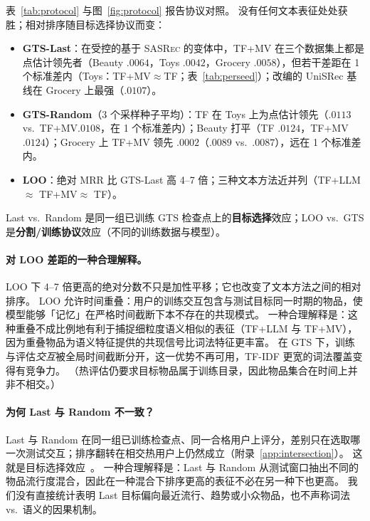 \documentclass[sigconf,natbib=true,anonymous]{acmart}
\newcommand{\tfidf}{\textsc{TF-IDF}\xspace}
\newcommand{\tfllm}{\textsc{TF+LLM}\xspace}
\newcommand{\tfmv}{\textsc{TF+MV}\xspace}
\newcommand{\base}{\textsc{SASRec}\xspace}
\begin{document}
表~\ref{tab:protocol} 与图~\ref{fig:protocol} 报告协议对照。
没有任何文本表征处处获胜；相对排序随目标选择协议而变：

\begin{itemize}[leftmargin=*,itemsep=1pt]
\item \textbf{GTS-Last}：在受控的基于 \base 的变体中，\tfmv 在三个数据集上都是点估计领先者（Beauty $.0064$，Toys $.0042$，Grocery $.0058$），但若干差距在 1 个标准差内（Toys：\tfmv$\approx$TF；表~\ref{tab:perseed}）；改编的 UniSRec 基线在 Grocery 上最强（$.0107$）。
\item \textbf{GTS-Random}（3 个采样种子平均）：TF 在 Toys 上为点估计领先（$.0113$ vs.\ \tfmv $.0108$，在 1 个标准差内）；Beauty 打平（TF $.0124$，\tfmv $.0124$）；Grocery 上 \tfmv 领先 $.0002$（$.0089$ vs.\ $.0087$），远在 1 个标准差内。
\item \textbf{LOO}：绝对 MRR 比 GTS-Last 高 4--7 倍；三种文本方法近并列（\tfllm $\approx$ \tfmv $\approx$ TF）。
\end{itemize}
Last vs.\ Random 是同一组已训练 GTS 检查点上的\textbf{目标选择}效应；LOO vs.\ GTS 是\textbf{分割/训练协议}效应（不同的训练数据与模型）。

\paragraph{对 LOO 差距的一种合理解释。}
LOO 下 4--7 倍更高的绝对分数不只是加性平移；它也改变了文本方法之间的相对排序。
LOO 允许时间重叠：用户的训练交互包含与测试目标同一时期的物品，使模型能够「记忆」在严格时间截断下本不存在的共现模式。
一种合理解释是：这种重叠不成比例地有利于捕捉细粒度语义相似的表征（\tfllm 与 \tfmv），因为重叠物品为语义特征提供的共现信号比词法特征更丰富。
在 GTS 下，训练与评估\emph{交互}被全局时间截断分开，这一优势不再可用，\tfidf 更宽的词法覆盖变得有竞争力。
（热评估仍要求目标物品属于训练目录，因此物品集合在时间上并非不相交。）

\paragraph{为何 Last 与 Random 不一致？}
Last 与 Random 在同一组已训练检查点、同一合格用户上评分，差别只在选取哪一次测试交互；排序翻转在相交热用户上仍然成立（附录~\ref{app:intersection}）。
这就是目标选择效应~\cite{gusak2025time}。
一种合理解释是：Last 与 Random 从测试窗口抽出不同的物品流行度混合，因此在一种混合下排序更高的表征不必在另一种下也更高。
我们没有直接统计表明 Last 目标偏向最近流行、趋势或小众物品，也不声称词法 vs.\ 语义的因果机制。
\end{document}
